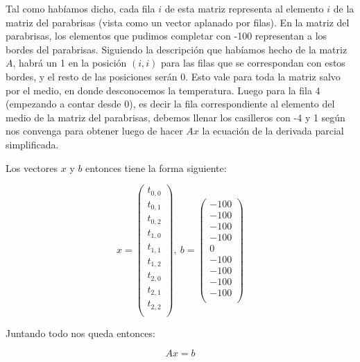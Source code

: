 Tal como habíamos dicho, cada fila $i$ de esta matriz representa al elemento $i$ de la matriz del parabrisas (vista como un vector aplanado por filas). En la matriz del parabrisas, los elementos que pudimos completar con -100 representan a los bordes del parabrisas. Siguiendo la descripción que habíamos hecho de la matriz $A$, habrá un 1 en la posición $(i,i)$ para las filas que se correspondan con estos bordes, y el resto de las posiciones serán 0. Esto vale para toda la matriz salvo por el medio, en donde desconocemos la temperatura. Luego para la fila $4$ (empezando a contar desde 0), es decir la fila correspondiente al elemento del medio de la matriz del parabrisas, debemos llenar los casilleros con -4 y 1 según nos convenga para obtener luego de hacer $Ax$ la ecuación de la derivada parcial simplificada.

Los vectores $x$ y $b$ entonces tiene la forma siguiente:

\[ x =  \left( \begin{array}{c}
t_{0,0} \\
t_{0,1} \\
t_{0,2} \\
t_{1,0} \\
t_{1,1} \\
t_{1,2} \\
t_{2,0} \\
t_{2,1} \\
t_{2,2} \\
\end{array} \right), \  b = \left( \begin{array}{c}
-100 \\
-100 \\
-100 \\
-100 \\
0 \\
-100 \\
-100 \\
-100 \\
-100 \\
\end{array} \right)
\] 

Juntando todo nos queda entonces:

\[ Ax = b \]

